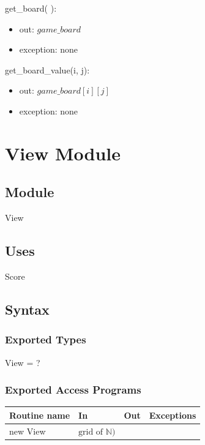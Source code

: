 \documentclass[12pt]{article}
\begin{document}
\noindent get\_board( ):
\begin{itemize}
\item out: $\mathit{game\_board}$
\item exception: none
\end{itemize}

\noindent get\_board\_value(i, j):
\begin{itemize}
\item out: $\mathit{game\_board[i][j]}$
\item exception: none
\end{itemize}

\newpage

\section* {View Module}

\subsection* {Module}

View

\subsection* {Uses}

Score

\subsection* {Syntax}

\subsubsection* {Exported Types}

View = ?

\subsubsection* {Exported Access Programs}

\begin{tabular}{| l | l | l | l |}
\hline
\textbf{Routine name} & \textbf{In} & \textbf{Out} & \textbf{Exceptions}\\
\hline
new View & $\text{grid of } \mathbb{N})$ & & \\
\hline

\end{tabular}
\end{document}
